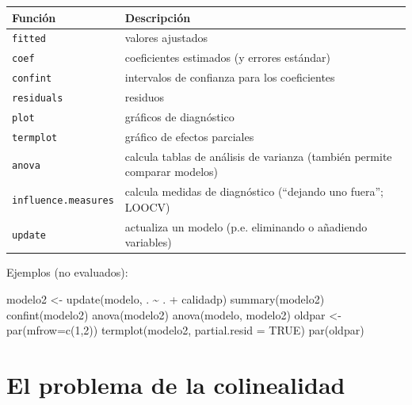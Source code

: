 \documentclass[
  spanish,
]{book}
\newenvironment{Shaded}{\begin{snugshade}}{\end{snugshade}}
\newcommand{\AttributeTok}[1]{\textcolor[rgb]{0.77,0.63,0.00}{#1}}
\newcommand{\ConstantTok}[1]{\textcolor[rgb]{0.00,0.00,0.00}{#1}}
\newcommand{\DecValTok}[1]{\textcolor[rgb]{0.00,0.00,0.81}{#1}}
\newcommand{\FunctionTok}[1]{\textcolor[rgb]{0.00,0.00,0.00}{#1}}
\newcommand{\NormalTok}[1]{#1}
\newcommand{\OtherTok}[1]{\textcolor[rgb]{0.56,0.35,0.01}{#1}}
\newcommand{\SpecialCharTok}[1]{\textcolor[rgb]{0.00,0.00,0.00}{#1}}
\theoremstyle{break}
\theoremstyle{definition}
\theoremstyle{definition}
\theoremstyle{definition}
\theoremstyle{definition}
\theoremstyle{remark}
\begin{document}
\begin{longtable}[]{@{}
  >{\raggedright\arraybackslash}p{}
  >{\raggedright\arraybackslash}p{}@{}}
\toprule
Función & Descripción \\
\midrule
\endhead
\texttt{fitted} & valores ajustados \\
\texttt{coef} & coeficientes estimados (y errores estándar) \\
\texttt{confint} & intervalos de confianza para los coeficientes \\
\texttt{residuals} & residuos \\
\texttt{plot} & gráficos de diagnóstico \\
\texttt{termplot} & gráfico de efectos parciales \\
\texttt{anova} & calcula tablas de análisis de varianza (también permite comparar modelos) \\
\texttt{influence.measures} & calcula medidas de diagnóstico (``dejando uno fuera''; LOOCV) \\
\texttt{update} & actualiza un modelo (p.e. eliminando o añadiendo variables) \\
\bottomrule
\end{longtable}

Ejemplos (no evaluados):

\begin{Shaded}
\begin{Highlighting}[]
\NormalTok{modelo2 }\OtherTok{\textless{}{-}} \FunctionTok{update}\NormalTok{(modelo, . }\SpecialCharTok{\textasciitilde{}}\NormalTok{ . }\SpecialCharTok{+}\NormalTok{ calidadp)}
\FunctionTok{summary}\NormalTok{(modelo2)}
\FunctionTok{confint}\NormalTok{(modelo2)}
\FunctionTok{anova}\NormalTok{(modelo2)}
\FunctionTok{anova}\NormalTok{(modelo, modelo2)}
\NormalTok{oldpar }\OtherTok{\textless{}{-}} \FunctionTok{par}\NormalTok{(}\AttributeTok{mfrow=}\FunctionTok{c}\NormalTok{(}\DecValTok{1}\NormalTok{,}\DecValTok{2}\NormalTok{))}
\FunctionTok{termplot}\NormalTok{(modelo2, }\AttributeTok{partial.resid =} \ConstantTok{TRUE}\NormalTok{)}
\FunctionTok{par}\NormalTok{(oldpar)}
\end{Highlighting}
\end{Shaded}

\hypertarget{colinealidad}{%
\section{El problema de la colinealidad}\label{colinealidad}}
\end{document}

